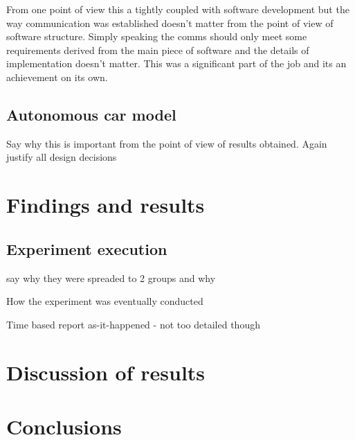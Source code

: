 \documentclass[11pt]{article}
\begin{document}
From one point of view this a tightly coupled with software development but the way
communication was established doesn’t matter from the point of view of software structure.
Simply speaking the comms should only meet some requirements derived from
the main piece of software and the details of implementation doesn’t matter. This was
a significant part of the job and its an achievement on its own.

\subsection{Autonomous car model}





Say why this is important from the point of view of results obtained. Again justify all
design decisions




\section{Findings and results}


\subsection{Experiment execution}

say why they were spreaded to 2 groups and why



How the experiment was eventually conducted

Time based report as-it-happened - not too detailed though

\section{Discussion of results}


\section{Conclusions}








\end{document}
